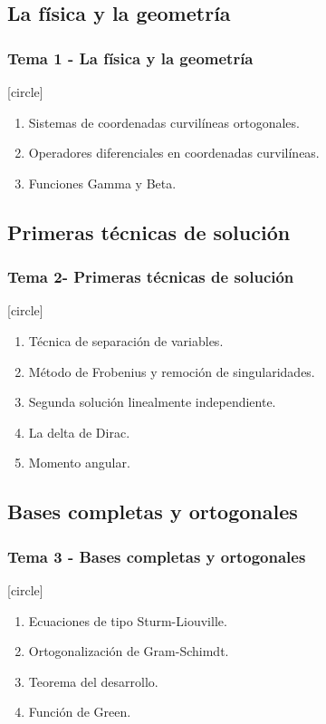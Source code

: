 \subsection{La física y la geometría}

\begin{frame}
\frametitle{Tema 1 - La física y la geometría}
[circle]
\begin{enumerate}[<+->]
\item Sistemas de coordenadas curvilíneas ortogonales.
\item Operadores diferenciales en coordenadas curvilíneas.
\item Funciones Gamma y Beta.
\end{enumerate}
\end{frame}
\subsection{Primeras técnicas de solución}
\begin{frame}
\frametitle{Tema 2- Primeras técnicas de solución}
[circle]
\begin{enumerate}[<+->]
\item Técnica de separación de variables.
\item Método de Frobenius y remoción de singularidades.
\item Segunda solución linealmente independiente.
\item La delta de Dirac.
\item Momento angular.
\end{enumerate}
\end{frame}
\subsection{Bases completas y ortogonales}
\begin{frame}
\frametitle{Tema 3 - Bases completas y ortogonales}
[circle]
\begin{enumerate}[<+->]
\item Ecuaciones de tipo Sturm-Liouville.
\item Ortogonalización de Gram-Schimdt.
\item Teorema del desarrollo.
\item Función de Green.   
\end{enumerate}
\end{frame}
